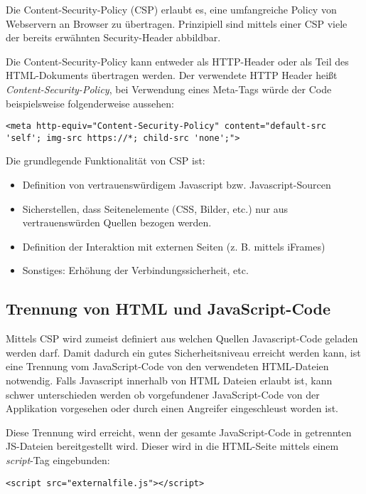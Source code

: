 Die Content-Security-Policy (CSP) erlaubt es, eine umfangreiche Policy von Webservern an Browser zu übertragen. Prinzipiell sind mittels einer CSP viele der bereits erwähnten Security-Header abbildbar.

Die Content-Security-Policy kann entweder als HTTP-Header oder als Teil des HTML-Dokuments übertragen werden. Der verwendete HTTP Header heißt \textit{Content-Security-Policy}, bei Verwendung eines Meta-Tags würde der Code beispielsweise folgenderweise aussehen:

\begin{verbatim}
<meta http-equiv="Content-Security-Policy" content="default-src 'self'; img-src https://*; child-src 'none';">
\end{verbatim}

Die grundlegende Funktionalität von CSP ist:

\begin{itemize}
	\item Definition von vertrauenswürdigem Javascript bzw. Javascript-Sourcen
	\item Sicherstellen, dass Seitenelemente (CSS, Bilder, etc.) nur aus vertrauenswürden Quellen bezogen werden.
	\item Definition der Interaktion mit externen Seiten (z. B. mittels iFrames)
	\item Sonstiges: Erhöhung der Verbindungssicherheit, etc.
\end{itemize}

\subsection{Trennung von HTML und JavaScript-Code}

Mittels CSP wird zumeist definiert aus welchen Quellen Javascript-Code geladen werden darf. Damit dadurch ein gutes Sicherheitsniveau erreicht werden kann, ist eine Trennung vom JavaScript-Code von den verwendeten HTML-Dateien notwendig. Falls Javascript innerhalb von HTML Dateien erlaubt ist, kann schwer unterschieden werden ob vorgefundener JavaScript-Code von der Applikation vorgesehen oder durch einen Angreifer eingeschleust worden ist.

Diese Trennung wird erreicht, wenn der gesamte JavaScript-Code in getrennten JS-Dateien bereitgestellt wird. Dieser wird in die HTML-Seite mittels einem \textit{script}-Tag eingebunden:

\begin{verbatim}
<script src="externalfile.js"></script>
\end{verbatim}

